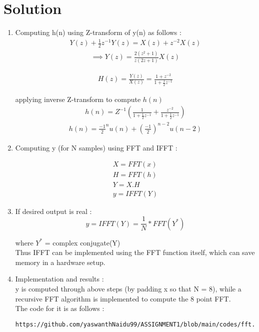 \documentclass[journal,12pt,twocolumn]{IEEEtran}
\renewcommand\thesection{\arabic{section}}
\begin{document}
\section{Solution}
\begin{enumerate}[label=\thesection.\arabic*.,ref=\thesection.\theenumi]
\item
Computing h(n) using Z-transform of y(n) as follows : 
\begin{align}
    Y(z) + \frac{1}{2}z^{-1}Y(z)=X(z) + z^{-2}X(z)
\end{align}
\begin{align}
    \implies Y(z)=\frac{2(z^2+1)}{z(2z+1)}X(z)
\end{align}

\begin{align}
    H(z) = \frac{Y(z)}{X(z)} = \frac{1+z^{-2}}{1+\frac{1}{2}z^{-1}}
\end{align}

applying inverse Z-transform to compute $h(n)$
\begin{align}
 h(n)= Z^{-1}\left( {\frac{1}{1+\frac{1}{2}z^{-1}} + \frac{z^{-2}}{1+\frac{1}{2}z^{-1}}} \right)
\end{align}
\begin{align}
 h(n)={\frac{-1}{2}}^nu(n) + \left({\frac{-1}{2}}\right)^{n-2}u(n-2)
\end{align}

\item Computing y (for N samples) using FFT and IFFT : 

\begin{align}
X = FFT(x)\\
H = FFT(h)\\
Y = X.H\\
y = IFFT(Y)
\end{align}


\item If desired output is real : 
\begin{equation}
    y = IFFT(Y) = \frac{1}{N}*FFT(Y^{*})
\end{equation}

where $Y^{*}$ = complex conjugate(Y)\\
Thus IFFT can be implemented using the FFT function itself, which can save memory in a hardware setup.\\

\item Implementation and results : \\
y is computed through above steps (by padding x so that N = 8), while a recursive FFT algorithm is implemented to compute the 8 point FFT.\\
The code for it is as follows :
\begin{lstlisting}
https://github.com/yaswanthNaidu99/ASSIGNMENT1/blob/main/codes/fft.py
\end{lstlisting}


\end{enumerate}
\end{document}
